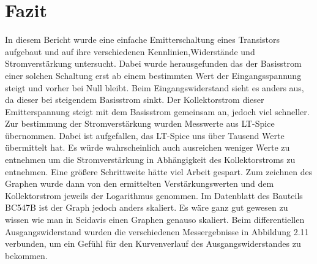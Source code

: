\chapter{Fazit}
In diesem Bericht wurde eine einfache Emitterschaltung eines Transistors aufgebaut und auf ihre verschiedenen Kennlinien,Widerstände und Stromverstärkung untersucht.
Dabei wurde herausgefunden das der Basisstrom einer solchen Schaltung erst ab einem bestimmten Wert der Eingangsspannung steigt und vorher bei Null bleibt. Beim Eingangswiderstand sieht es anders aus, da dieser bei steigendem Basisstrom sinkt. Der Kollektorstrom dieser Emitterspannung steigt mit dem Basisstrom gemeinsam an, jedoch viel schneller. Zur bestimmung der Stromverstärkung wurden Messwerte aus LT-Spice übernommen. Dabei ist aufgefallen, das LT-Spice uns über Tausend Werte übermittelt hat. Es würde wahrscheinlich auch ausreichen weniger Werte zu entnehmen um die Stromverstärkung in Abhängigkeit des Kollektorstroms zu entnehmen. Eine größere Schrittweite hätte viel Arbeit gespart. Zum zeichnen des Graphen wurde dann von den ermittelten Verstärkungswerten und dem Kollektorstrom jeweils der Logarithmus genommen. Im Datenblatt des Bauteils BC547B ist der Graph jedoch anders skaliert. Es wäre ganz gut gewesen zu wissen wie man in Scidavis einen Graphen genauso skaliert. Beim differentiellen Ausgangswiderstand wurden die verschiedenen Messergebnisse in Abbildung 2.11 verbunden, um ein Gefühl für den Kurvenverlauf des Ausgangswiderstandes zu bekommen.